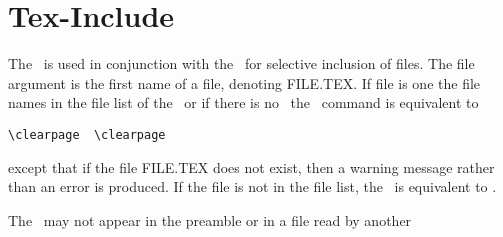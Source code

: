 \section {Tex-Include}

\verb||

The \ is used in conjunction with the \ for
selective inclusion of files. The file argument is the first name of a file,
denoting FILE.TEX. If file is one the file names in the file list of the
\ or if there is no \ the \
command is equivalent to

\begin{verbatim}
\clearpage  \clearpage
\end{verbatim} 


except that if the file FILE.TEX does not exist, then a warning message
rather than an error is produced. If the file is not in the file list, the
\ is equivalent to \clearpage.

The \ may not appear in the preamble or in a file read by
another \